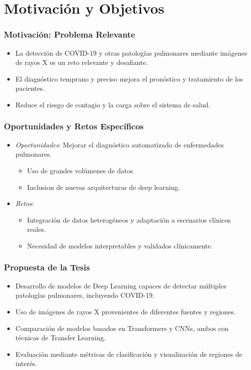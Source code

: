 
\section{Motivación y Objetivos}

\begin{frame}
\frametitle{Motivación: Problema Relevante}
\begin{itemize}
    \item La detección de COVID-19 y otras patologías pulmonares mediante imágenes de rayos X es un reto relevante y desafiante.
    \item El diagnóstico temprano y preciso mejora el pronóstico y tratamiento de los pacientes.
    \item Reduce el riesgo de contagio y la carga sobre el sistema de salud.
\end{itemize}
\end{frame}

\begin{frame}
\frametitle{Oportunidades y Retos Específicos}
\begin{itemize}
    \item \textit{Oportunidades}: Mejorar el diagnóstico automatizado de enfermedades pulmonares.
    \begin{itemize}
        \item Uso de grandes volúmenes de datos
        \item Inclusion de nuevas arquitecturas de deep learning.
    \end{itemize}
\end{itemize}
\begin{itemize}
    \item \textit{Retos}:
    \begin{itemize}
        \item Integración de datos heterogéneos y adaptación a escenarios clínicos reales.
        \item Necesidad de modelos interpretables y validados clínicamente.
    \end{itemize}
\end{itemize}
\end{frame}

\begin{frame}
\frametitle{Propuesta de la Tesis}
\begin{itemize}
    \item Desarrollo de modelos de Deep Learning capaces de detectar múltiples patologías pulmonares, incluyendo COVID-19.
    \item Uso de imágenes de rayos X provenientes de diferentes fuentes y regiones.
    \item Comparación de modelos basados en Transformers y CNNs, ambos con técnicas de Transfer Learning.
    \item Evaluación mediante métricas de clasificación y visualización de regiones de interés.
\end{itemize}
\end{frame}

